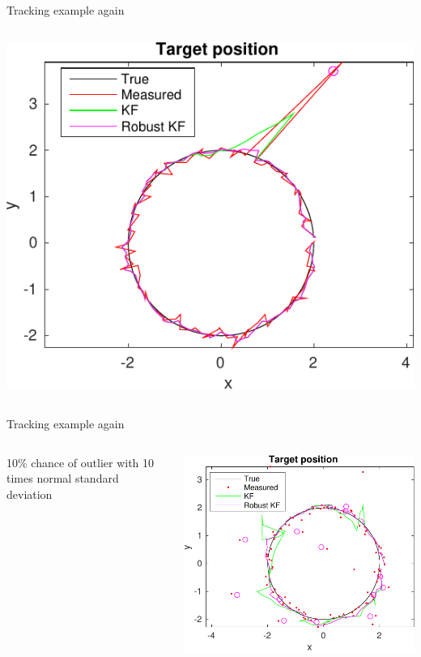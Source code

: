 \documentclass[presentation,aspectratio=169]{beamer}
\begin{document}
\begin{frame}[label=sec-3-5]{Tracking example again}
\begin{columns}
\begin{column}{0.7\textwidth}
\begin{center}
   \includegraphics[width=0.9\linewidth]{circular-movement-rkf-crop}
   \end{center}
\end{column}
\end{columns}
\end{frame}

\begin{frame}[label=sec-3-6]{Tracking example again}
\begin{columns}
\begin{column}{0.3\textwidth}
10\% chance of outlier with 10 times normal standard deviation
\end{column}

\begin{column}{0.7\textwidth}
\begin{center}
\includegraphics[width=0.9\linewidth]{circular-movement-rkf-2-crop}
\end{center}
\end{column}
\end{columns}
\end{frame}
\end{document}

